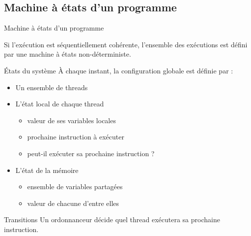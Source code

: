 \subsection{Machine à états d'un programme}

\begin{frame}[fragile]{Machine à états d'un programme}

Si l'exécution est séquentiellement cohérente, l'ensemble des exécutions est défini par une machine à états non-déterministe.

\begin{block}{États du système}
  À chaque instant, la \alert{configuration globale} est définie par :
  \begin{itemize}
    \item Un ensemble de threads
    \item L'état local de chaque thread
      \begin{itemize}
        \item valeur de ses variables locales
        \item prochaine instruction à exécuter
        \item peut-il exécuter sa prochaine instruction ? 
      \end{itemize}
    \item L'état de la mémoire
      \begin{itemize}
        \item ensemble de variables partagées
        \item valeur de chacune d'entre elles
      \end{itemize}
  \end{itemize}
  \end{block}

  \begin{block}{Transitions}
    Un \alert{ordonnanceur} décide quel thread exécutera sa prochaine instruction.
  \end{block}
\end{frame}

